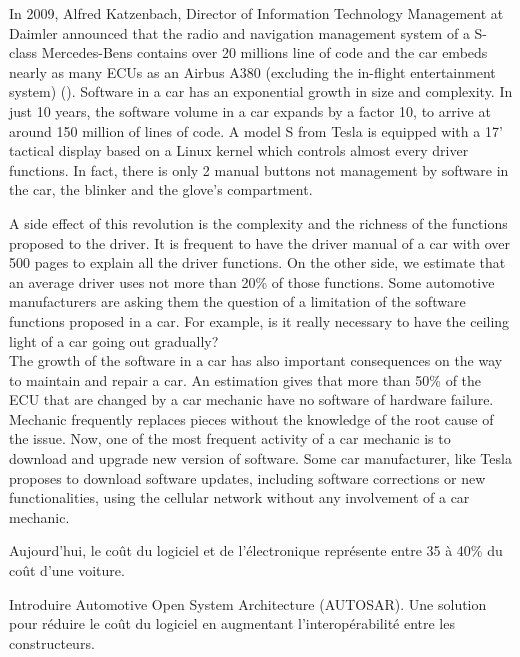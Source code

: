 In 2009, Alfred Katzenbach, Director of Information Technology Management at Daimler announced that the radio and navigation management system of a S-class Mercedes-Bens contains over 20 millions line of code and the car embeds nearly as many ECUs as an Airbus A380 (excluding the in-flight entertainment system) (\cite{Cha09}). Software in a car has an exponential growth in size and complexity. In just 10 years, the software volume in a car expands by a factor 10, to arrive at around 150 million of lines of code. A model S from Tesla is equipped with a 17' tactical display based on a Linux kernel which controls almost every driver functions. In fact, there is only 2 manual buttons not management by software in the car, the blinker and the glove's compartment.


A side effect of this revolution is the complexity and the richness of the functions proposed to the driver. It is frequent to have the driver manual of a car with over 500 pages to explain all the driver functions. On the other side, we estimate that an average driver uses not more than 20\% of those functions. Some automotive manufacturers are asking them the question of a limitation of the software functions proposed in a car. For example, is it really necessary to have the ceiling light of a car going out gradually?\\

The growth of the software in a car has also important consequences on the way to maintain and repair a car. An estimation gives that more than 50\% of the ECU that are changed by a car mechanic have no software of hardware failure. Mechanic frequently replaces pieces without the knowledge of the root cause of the issue. Now, one of the most frequent activity of a car mechanic is to download and upgrade new version of software. Some car manufacturer, like Tesla proposes to download software updates, including software corrections or new functionalities, using the cellular network without any involvement of a car mechanic.


Aujourd'hui, le co\^ut du logiciel et de l'\'electronique repr\'esente entre 35 \`a 40\% du co\^ut d'une voiture. \\


\begin{tbd}
Introduire Automotive Open System Architecture (AUTOSAR). Une solution pour r\'eduire le co\^ut du logiciel en augmentant l'interop\'erabilit\'e entre les constructeurs.
\end{tbd}


